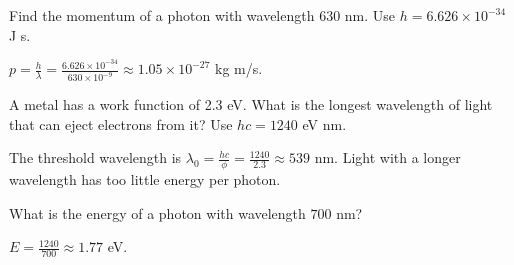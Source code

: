 \begin{Exercise}[label=ph2, title={Momentum of a photon}]
Find the momentum of a photon with wavelength 630 nm. Use $h = 6.626 \times 10^{-34}$ J s.
\end{Exercise}
\begin{Answer}[ref=ph2]
$p = \frac{h}{\lambda} = \frac{6.626 \times 10^{-34}}{630 \times 10^{-9}} \approx 1.05 \times 10^{-27}$ kg m/s.
\end{Answer}

\begin{Exercise}[label=ph3, title={Threshold wavelength}]
A metal has a work function of 2.3 eV. What is the longest wavelength of light that can eject electrons from it? Use $hc = 1240$ eV nm.
\end{Exercise}
\begin{Answer}[ref=ph3]
The threshold wavelength is $\lambda_0 = \frac{hc}{\phi} = \frac{1240}{2.3} \approx 539$ nm. Light with a longer wavelength has too little energy per photon.
\end{Answer}

\begin{Exercise}[title={Red Light}, label=ph4]
What is the energy of a photon with wavelength $700$ nm?
\end{Exercise}
\begin{Answer}[ref=ph4]
$E = \frac{1240}{700} \approx 1.77$ eV.
\end{Answer}
